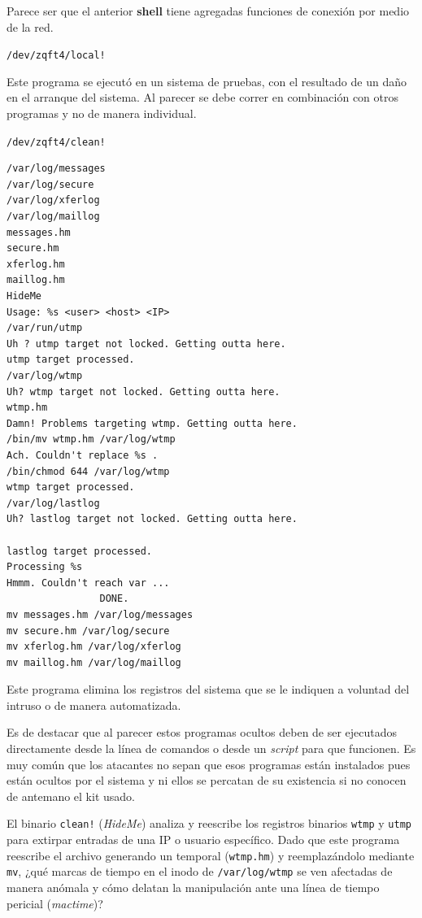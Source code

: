 \vspace{1em}

Parece ser que el anterior \textbf{shell} tiene agregadas funciones de conexión
por medio de la red.

\texttt{/dev/zqft4/local!}

Este programa se ejecutó en un sistema de pruebas, con el resultado
de un daño en el arranque del sistema. Al parecer se debe correr en
combinación con otros programas y no de manera individual.

\texttt{/dev/zqft4/clean!}

\vspace{1em}

\begin{lstlisting}[style=terminal]
/var/log/messages
/var/log/secure
/var/log/xferlog
/var/log/maillog
messages.hm
secure.hm
xferlog.hm
maillog.hm
HideMe
Usage: %s <user> <host> <IP>
/var/run/utmp
Uh ? utmp target not locked. Getting outta here.
utmp target processed.
/var/log/wtmp
Uh? wtmp target not locked. Getting outta here.
wtmp.hm
Damn! Problems targeting wtmp. Getting outta here.
/bin/mv wtmp.hm /var/log/wtmp
Ach. Couldn't replace %s .
/bin/chmod 644 /var/log/wtmp
wtmp target processed.
/var/log/lastlog
Uh? lastlog target not locked. Getting outta here.

lastlog target processed.
Processing %s
Hmmm. Couldn't reach var ...
                DONE.
mv messages.hm /var/log/messages
mv secure.hm /var/log/secure
mv xferlog.hm /var/log/xferlog
mv maillog.hm /var/log/maillog
\end{lstlisting}

\vspace{1em}

 Este programa elimina los registros del sistema que se le indiquen a
voluntad del intruso o de manera automatizada.
 
 Es de destacar que al parecer estos programas ocultos deben de ser ejecutados
directamente desde la línea de comandos o desde un \textit{script} para que funcionen. 
Es muy común que los atacantes no sepan que esos programas están instalados 
pues están ocultos por el sistema y ni ellos se percatan de su existencia si 
no conocen de antemano el kit usado.

\begin{retoforense}
El binario \texttt{clean!} (\textit{HideMe}) analiza y reescribe los registros binarios \texttt{wtmp} y \texttt{utmp} para extirpar entradas de una IP o usuario específico. Dado que este programa reescribe el archivo generando un temporal (\texttt{wtmp.hm}) y reemplazándolo mediante \texttt{mv}, ¿qué marcas de tiempo en el inodo de \texttt{/var/log/wtmp} se ven afectadas de manera anómala y cómo delatan la manipulación ante una línea de tiempo pericial (\textit{mactime})?
\end{retoforense}

